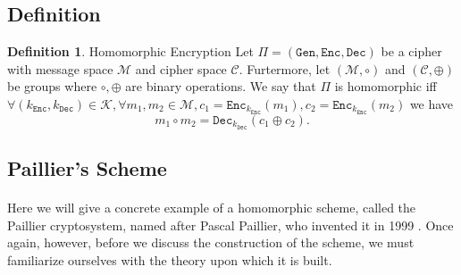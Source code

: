 \documentclass{article}
\theoremstyle{definition}
\newtheorem{definition}{Definition}[section]
\newcommand{\Enc}{\texttt{Enc}}
\newcommand{\Dec}{\texttt{Dec}}
\newcommand{\Gen}{\texttt{Gen}}
\newcommand{\M}{\mathcal{M}}
\renewcommand{\C}{\mathcal{C}}
\newcommand{\K}{\mathcal{K}}
\begin{document}
\subsection{Definition}
\begin{definition}{Homomorphic Encryption}
  Let $\Pi = (\Gen, \Enc, \Dec)$ be a cipher with message space $\M$ and cipher
  space $\C$. Furtermore, let $(\M, \circ)$ and $(\C, \oplus)$ be groups where
  $\circ, \oplus$ are binary operations.
  We say that $\Pi$ is homomorphic iff $\forall (k_\Enc, k_\Dec) \in \K, \forall
  m_1, m_2 \in \M, c_1 = \Enc_{k_\Enc}(m_1), c_2 = \Enc_{k_\Enc}(m_2)$ we have
  \[
    m_1 \circ m_2 = \Dec_{k_\Dec}(c_1 \oplus c_2).
  \]
\end{definition}
\subsection{Paillier's Scheme}
\paragraph{}
Here we will give a concrete example of a homomorphic scheme, called the Paillier
cryptosystem, named after Pascal Paillier, who invented it in 1999
\cite{paillier1999public}. Once again, however, before we discuss the
construction of the scheme, we must familiarize ourselves with the theory upon
which it is built.
\end{document}
